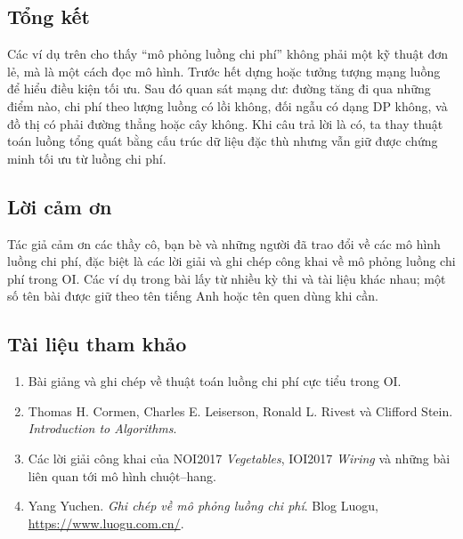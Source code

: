 \documentclass[11pt]{article}
\begin{document}
\subsection{Tổng kết}

Các ví dụ trên cho thấy ``mô phỏng luồng chi phí'' không phải một kỹ thuật đơn
lẻ, mà là một cách đọc mô hình. Trước hết dựng hoặc tưởng tượng mạng luồng để
hiểu điều kiện tối ưu. Sau đó quan sát mạng dư: đường tăng đi qua những điểm
nào, chi phí theo lượng luồng có lồi không, đối ngẫu có dạng DP không, và đồ thị
có phải đường thẳng hoặc cây không. Khi câu trả lời là có, ta thay thuật toán
luồng tổng quát bằng cấu trúc dữ liệu đặc thù nhưng vẫn giữ được chứng minh tối
ưu từ luồng chi phí.

\subsection*{Lời cảm ơn}

Tác giả cảm ơn các thầy cô, bạn bè và những người đã trao đổi về các mô hình
luồng chi phí, đặc biệt là các lời giải và ghi chép công khai về mô phỏng luồng
chi phí trong OI. Các ví dụ trong bài lấy từ nhiều kỳ thi và tài liệu khác nhau;
một số tên bài được giữ theo tên tiếng Anh hoặc tên quen dùng khi cần.

\subsection*{Tài liệu tham khảo}

\begin{enumerate}
  \item Bài giảng và ghi chép về thuật toán luồng chi phí cực tiểu trong OI.
  \item Thomas H. Cormen, Charles E. Leiserson, Ronald L. Rivest và Clifford
  Stein. \emph{Introduction to Algorithms}.
  \item Các lời giải công khai của NOI2017 \emph{Vegetables}, IOI2017
  \emph{Wiring} và những bài liên quan tới mô hình chuột--hang.
  \item Yang Yuchen. \emph{Ghi chép về mô phỏng luồng chi phí}. Blog Luogu,
  \url{https://www.luogu.com.cn/}.
\end{enumerate}
\end{document}
